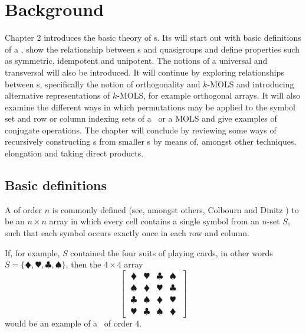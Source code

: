 \chapter{Background}
\vspace{-2em}
\minitoc
\setcounter{ls}{0}

Chapter 2 introduces the basic theory of \lat s. Its will start out with basic definitions of a \lat, show the relationship between \lat s and quasigroups and define properties such as symmetric, idempotent and unipotent. The notions of a universal and transversal will also be introduced.
It will continue by exploring relationships between \lat s, specifically the notion of orthogonality and $k$-MOLS and introducing alternative representations of $k$-MOLS, for example orthogonal arrays.
It will also examine the different ways in which permutations may be applied to the symbol set and row or column indexing sets of a \lat \ or a MOLS and give examples of conjugate operations.
The chapter will conclude by reviewing some ways of recursively constructing \lat s from smaller \lat s by means of, amongst other techniques, elongation and taking direct products.


\section{Basic definitions} 
A \emph{\lat} of order $n$ is commonly defined (see, amongst others, Colbourn and Dinitz \cite[Definition 1.1]{colb} ) to be an $n\times n$ array in which every cell contains a single symbol from an $n$-set $S$, such that each symbol occurs exactly once in each row and column.

If, for example,  $S$ contained the four suits of playing cards, in other words $S  = \{ \vardiamond, \varheart, \clubsuit, \spadesuit\}$, then the $4 \times 4$ array
\[ \left[ \;\begin{matrix}
\vardiamond & \varheart & \clubsuit & \spadesuit \\
\spadesuit & \vardiamond & \varheart & \clubsuit  \\
\clubsuit & \spadesuit & \vardiamond & \varheart   \\
\varheart & \clubsuit & \spadesuit & \vardiamond  
\end{matrix} \;\right]
\] would be an example of a \lat \ of order $4$. 
 
